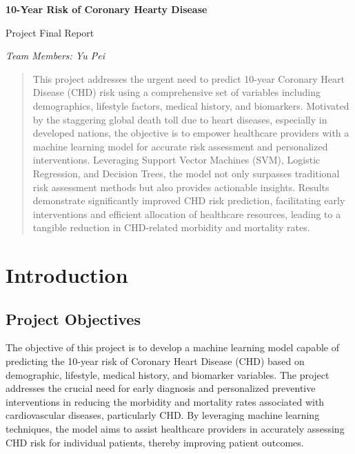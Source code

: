 \documentclass[11pt]{article}
\begin{document}
\begin{center}
{\Large \textbf{10-Year Risk of Coronary Hearty Disease}

\vspace{10pt}

Project Final Report}

\vspace{10pt}

\textit{Team Members: Yu Pei}
\end{center}

\begin{abstract}
  This project addresses the urgent need to predict 10-year Coronary Heart Disease (CHD) risk using a comprehensive set of variables including demographics, lifestyle factors, medical history, and biomarkers. Motivated by the staggering global death toll due to heart diseases, especially in developed nations, the objective is to empower healthcare providers with a machine learning model for accurate risk assessment and personalized interventions. Leveraging Support Vector Machines (SVM), Logistic Regression, and Decision Trees, the model not only surpasses traditional risk assessment methods but also provides actionable insights. Results demonstrate significantly improved CHD risk prediction, facilitating early interventions and efficient allocation of healthcare resources, leading to a tangible reduction in CHD-related morbidity and mortality rates.
\end{abstract}
\section{Introduction}
\subsection{Project Objectives}
\text The objective of this project is to develop a machine learning model capable of predicting the 10-year risk of Coronary Heart Disease (CHD) based on demographic, lifestyle, medical history, and biomarker variables. The project addresses the crucial need for early diagnosis and personalized preventive interventions in reducing the morbidity and mortality rates associated with cardiovascular diseases, particularly CHD. By leveraging machine learning techniques, the model aims to assist healthcare providers in accurately assessing CHD risk for individual patients, thereby improving patient outcomes.
\end{document}
